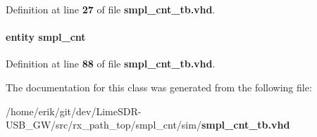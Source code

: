Definition at line {\bf 27} of file {\bf smpl\+\_\+cnt\+\_\+tb.\+vhd}.

\paragraph[{smpl\+\_\+cnt\+\_\+dut0}]{ {\bfseries \textcolor{keywordflow}{entity}\textcolor{vhdlchar}{ }\textcolor{vhdlchar}{smpl\+\_\+cnt}\textcolor{vhdlchar}{ }} \hspace{0.3cm}{\ttfamily [Instantiation]}}\label{classsmpl__cnt__tb_1_1tb__behave_ab67d7763993cb0b2b16285165aa86f2f}


Definition at line {\bf 88} of file {\bf smpl\+\_\+cnt\+\_\+tb.\+vhd}.



The documentation for this class was generated from the following file\+:\begin{DoxyCompactItemize}
\item 
/home/erik/git/dev/\+Lime\+S\+D\+R-\/\+U\+S\+B\+\_\+\+G\+W/src/rx\+\_\+path\+\_\+top/smpl\+\_\+cnt/sim/{\bf smpl\+\_\+cnt\+\_\+tb.\+vhd}\end{DoxyCompactItemize}
